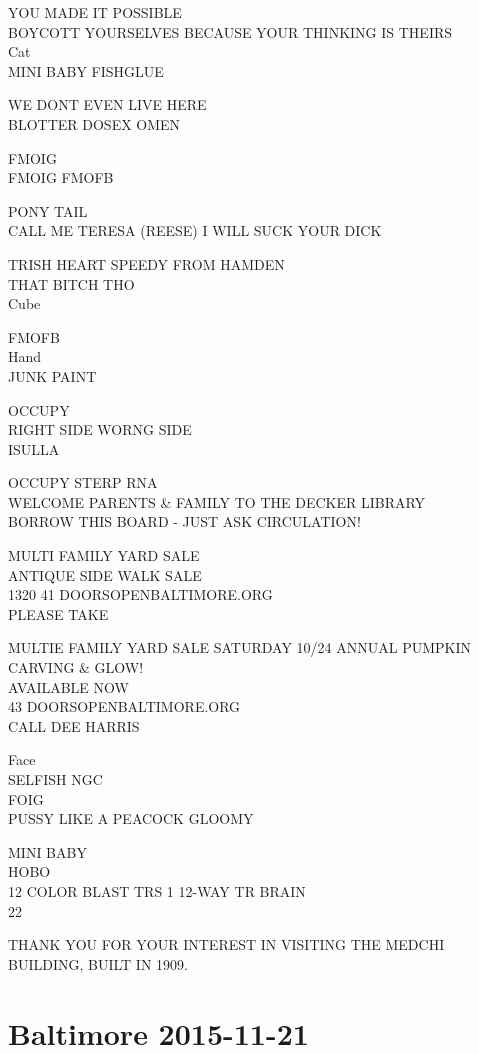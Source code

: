 \documentclass[10pt,letterpaper]{article}
\begin{document}
YOU MADE IT POSSIBLE\\
BOYCOTT YOURSELVES BECAUSE YOUR THINKING IS THEIRS\\
Cat\\
MINI BABY FISHGLUE

WE DONT EVEN LIVE HERE\\
BLOTTER DOSEX OMEN

FMOIG\\
FMOIG FMOFB

PONY TAIL\\
CALL ME TERESA (REESE) I WILL SUCK YOUR DICK

TRISH HEART SPEEDY FROM HAMDEN\\
THAT BITCH THO\\
Cube

FMOFB\\
Hand\\
JUNK PAINT

OCCUPY\\
RIGHT SIDE WORNG SIDE\\
ISULLA

OCCUPY STERP RNA\\
WELCOME PARENTS \& FAMILY TO THE DECKER LIBRARY\\
BORROW THIS BOARD {-} JUST ASK CIRCULATION!

MULTI FAMILY YARD SALE\\
ANTIQUE SIDE WALK SALE\\
1320 41 DOORSOPENBALTIMORE.ORG\\
PLEASE TAKE

MULTIE FAMILY YARD SALE SATURDAY 10/24 ANNUAL PUMPKIN CARVING \& GLOW!\\
AVAILABLE NOW\\
43 DOORSOPENBALTIMORE.ORG\\
CALL DEE HARRIS

Face\\
SELFISH NGC\\
FOIG\\
PUSSY LIKE A PEACOCK GLOOMY

MINI BABY\\
HOBO\\
12 COLOR BLAST TRS 1 12{-}WAY TR BRAIN\\
22

THANK YOU FOR YOUR INTEREST IN VISITING THE MEDCHI BUILDING, BUILT IN 1909.
\

\section*{Baltimore 2015-11-21}
\end{document}
